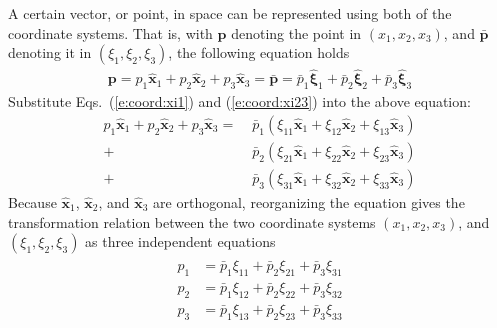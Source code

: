 \documentclass[a4paper,12pt,dvips]{article}
\begin{document}
A certain vector, or point, in space can be represented using both of the
coordinate systems.  That is, with $\mathbf{p}$ denoting the point in $(x_1,
x_2, x_3)$, and $\bar{\mathbf{p}}$ denoting it in $(\xi_1, \xi_2, \xi_3)$, the
following equation holds
\begin{align*}
  \mathbf{p}
  = p_1 \hat{\mathbf{x}}_1 + p_2 \hat{\mathbf{x}}_2 + p_3 \hat{\mathbf{x}}_3
  = \bar{\mathbf{p}}
  = \bar{p}_1 \hat{\boldsymbol{\xi}}_1
  + \bar{p}_2 \hat{\boldsymbol{\xi}}_2
  + \bar{p}_3 \hat{\boldsymbol{\xi}}_3
\end{align*}
Substitute Eqs.~(\ref{e:coord:xi1}) and (\ref{e:coord:xi23}) into the above
equation:
\begin{align*}
  p_1 \hat{\mathbf{x}}_1 + p_2 \hat{\mathbf{x}}_2 + p_3 \hat{\mathbf{x}}_3
  = \; 
   &\bar{p}_1 (\xi_{11} \hat{\mathbf{x}}_1 + \xi_{12} \hat{\mathbf{x}}_2
             + \xi_{13} \hat{\mathbf{x}}_3)
  \\
  + \;
   &\bar{p}_2 (\xi_{21} \hat{\mathbf{x}}_1 + \xi_{22} \hat{\mathbf{x}}_2
             + \xi_{23} \hat{\mathbf{x}}_3)
  \\
  + \;
   &\bar{p}_3 (\xi_{31} \hat{\mathbf{x}}_1 + \xi_{32} \hat{\mathbf{x}}_2
             + \xi_{33} \hat{\mathbf{x}}_3)
\end{align*}
Because $\hat{\mathbf{x}}_1$, $\hat{\mathbf{x}}_2$, and $\hat{\mathbf{x}}_3$
are orthogonal, reorganizing the equation gives the transformation relation
between the two coordinate systems $(x_1, x_2, x_3)$, and $(\xi_1, \xi_2,
\xi_3)$ as three independent equations
\begin{align}
\begin{aligned}
  p_1 &= \bar{p}_1 \xi_{11} + \bar{p}_2 \xi_{21} + \bar{p}_3 \xi_{31}
  \\
  p_2 &= \bar{p}_1 \xi_{12} + \bar{p}_2 \xi_{22} + \bar{p}_3 \xi_{32}
  \\
  p_3 &= \bar{p}_1 \xi_{13} + \bar{p}_2 \xi_{23} + \bar{p}_3 \xi_{33}
\end{aligned}
\label{e:rotrel}
\end{align}
\end{document}
